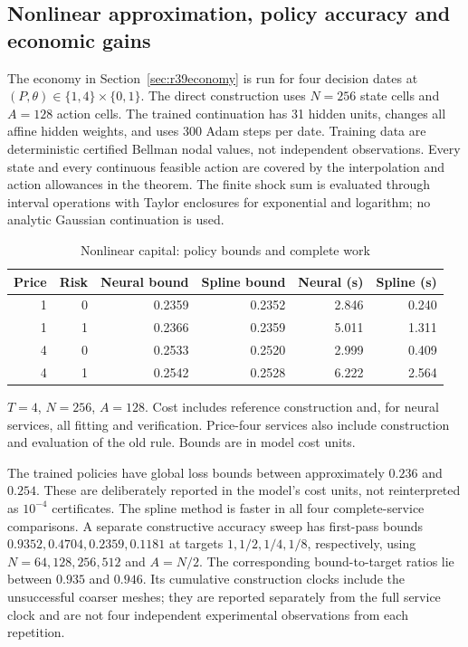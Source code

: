 \documentclass[ecta,nameyear,draft]{econsocart}
\theoremstyle{definition}
\theoremstyle{remark}
\begin{document}
\subsection{Nonlinear approximation, policy accuracy and economic gains}
The economy in Section~\ref{sec:r39economy} is run for four decision dates at
$(P,\theta)\in\{1,4\}\times\{0,1\}$. The direct construction uses $N=256$
state cells and $A=128$ action cells. The trained continuation has 31 hidden
units, changes all affine hidden weights, and uses 300 Adam steps per date.
Training data are deterministic certified Bellman nodal values, not independent
observations. Every state and every continuous feasible action are covered by
the interpolation and action allowances in the theorem. The finite shock sum
is evaluated through interval operations with Taylor enclosures for exponential
and logarithm; no analytic Gaussian continuation is used.


\begin{table}[htbp]
\centering\small\setlength{\tabcolsep}{5pt}
\caption{Nonlinear capital: policy bounds and complete work}\label{tab:r39nonlinear}
\begin{tabular}{rrrrrr}
\toprule
Price & Risk & Neural bound & Spline bound & Neural (s) & Spline (s)\\
\midrule
1 & 0 & 0.2359 & 0.2352 & 2.846 & 0.240\\
1 & 1 & 0.2366 & 0.2359 & 5.011 & 1.311\\
4 & 0 & 0.2533 & 0.2520 & 2.999 & 0.409\\
4 & 1 & 0.2542 & 0.2528 & 6.222 & 2.564\\
\bottomrule
\end{tabular}
\par\smallskip\begin{minipage}{.96\linewidth}\footnotesize $T=4$, $N=256$, $A=128$. Cost includes reference construction and, for neural services, all fitting and verification. Price-four services also include construction and evaluation of the old rule. Bounds are in model cost units.\end{minipage}
\end{table}



The trained policies have global loss bounds between approximately $0.236$ and
$0.254$. These are deliberately reported in the model's cost units, not
reinterpreted as $10^{-4}$ certificates. The spline method is faster in all
four complete-service comparisons. A separate constructive accuracy sweep
has first-pass bounds $0.9352,0.4704,0.2359,0.1181$ at targets
$1,1/2,1/4,1/8$, respectively, using $N=64,128,256,512$ and $A=N/2$.
The corresponding bound-to-target ratios lie between $0.935$ and $0.946$.
Its cumulative construction clocks include the unsuccessful coarser meshes;
they are reported separately from the full service clock and are not four
independent experimental observations from each repetition.
\end{document}
